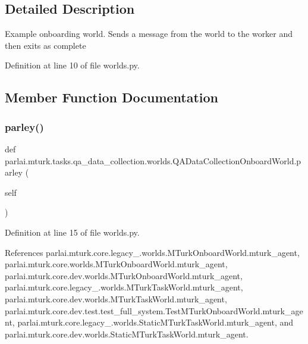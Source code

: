 \subsection{Detailed Description}
\begin{DoxyVerb}Example onboarding world. Sends a message from the world to the
worker and then exits as complete
\end{DoxyVerb}
 

Definition at line 10 of file worlds.\+py.



\subsection{Member Function Documentation}
\mbox{\label{classparlai_1_1mturk_1_1tasks_1_1qa__data__collection_1_1worlds_1_1QADataCollectionOnboardWorld_a2cbf0247b9bf28187bbfe164082ec5fb}} 
\subsubsection{\texorpdfstring{parley()}{parley()}}
{\footnotesize\ttfamily def parlai.\+mturk.\+tasks.\+qa\+\_\+data\+\_\+collection.\+worlds.\+Q\+A\+Data\+Collection\+Onboard\+World.\+parley (\begin{DoxyParamCaption}\item[{}]{self }\end{DoxyParamCaption})}



Definition at line 15 of file worlds.\+py.



References parlai.\+mturk.\+core.\+legacy\+\_.\+worlds.\+M\+Turk\+Onboard\+World.\+mturk\+\_\+agent, parlai.\+mturk.\+core.\+worlds.\+M\+Turk\+Onboard\+World.\+mturk\+\_\+agent, parlai.\+mturk.\+core.\+dev.\+worlds.\+M\+Turk\+Onboard\+World.\+mturk\+\_\+agent, parlai.\+mturk.\+core.\+legacy\+\_.\+worlds.\+M\+Turk\+Task\+World.\+mturk\+\_\+agent, parlai.\+mturk.\+core.\+dev.\+worlds.\+M\+Turk\+Task\+World.\+mturk\+\_\+agent, parlai.\+mturk.\+core.\+dev.\+test.\+test\+\_\+full\+\_\+system.\+Test\+M\+Turk\+Onboard\+World.\+mturk\+\_\+agent, parlai.\+mturk.\+core.\+legacy\+\_.\+worlds.\+Static\+M\+Turk\+Task\+World.\+mturk\+\_\+agent, and parlai.\+mturk.\+core.\+dev.\+worlds.\+Static\+M\+Turk\+Task\+World.\+mturk\+\_\+agent.




